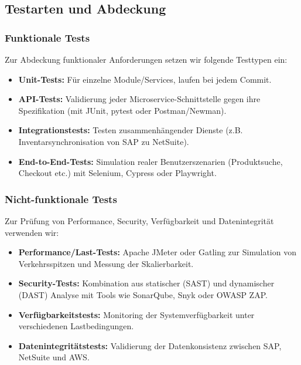 \subsection{Testarten und Abdeckung}

\subsubsection{Funktionale Tests}

Zur Abdeckung funktionaler Anforderungen setzen wir folgende Testtypen ein:
\begin{itemize}
    \item \textbf{Unit-Tests:} Für einzelne Module/Services, laufen bei jedem Commit.
    \item \textbf{API-Tests:} Validierung jeder Microservice-Schnittstelle gegen ihre Spezifikation
    (mit JUnit, pytest oder Postman/Newman).
    \item \textbf{Integrationstests:} Testen zusammenhängender Dienste (z.B. Inventarsynchronisation
    von SAP zu NetSuite).
    \item \textbf{End-to-End-Tests:} Simulation realer Benutzerszenarien (Produktsuche, Checkout etc.)
    mit Selenium, Cypress oder Playwright.
\end{itemize}

\subsubsection{Nicht-funktionale Tests}
Zur Prüfung von Performance, Security, Verfügbarkeit und Datenintegrität verwenden wir:

\begin{itemize}
    \item \textbf{Performance/Last-Tests:} Apache JMeter oder Gatling zur Simulation von
    Verkehrsspitzen und Messung der Skalierbarkeit.
    \item \textbf{Security-Tests:} Kombination aus statischer (SAST) und dynamischer (DAST)
    Analyse mit Tools wie SonarQube, Snyk oder OWASP ZAP.
    \item \textbf{Verfügbarkeitstests:} Monitoring der Systemverfügbarkeit unter
    verschiedenen Lastbedingungen.
    \item \textbf{Datenintegritätstests:} Validierung der Datenkonsistenz zwischen SAP,
    NetSuite und AWS.
\end{itemize}

